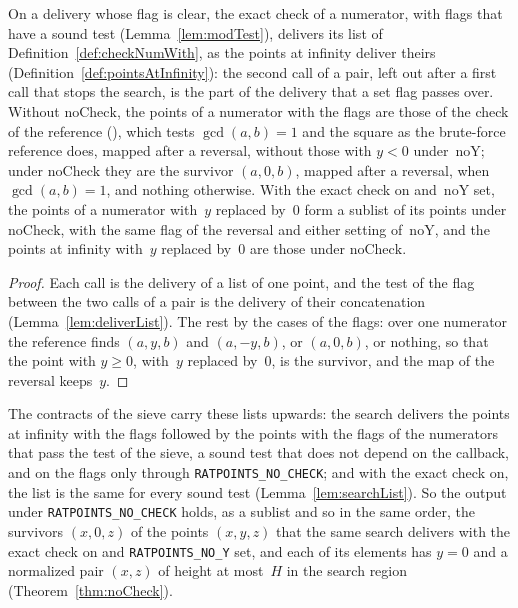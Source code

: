 \begin{lemma}\label{lem:checkNumWith}
  \leanok
  On a delivery whose flag is clear, the exact check of a numerator, with flags that have a sound
  test (Lemma~\ref{lem:modTest}), delivers its list of Definition~\ref{def:checkNumWith}, as the
  points at infinity deliver theirs (Definition~\ref{def:pointsAtInfinity}): the second call of a
  pair, left out after a first call that stops the search, is the part of the delivery that a set
  flag passes over. Without $\mathrm{noCheck}$, the points of a numerator with the flags are those
  of the check of the reference (), which tests $\gcd(a, b) = 1$ and
  the square as the brute-force reference does, mapped after a reversal, without those with $y < 0$
  under~$\mathrm{noY}$; under $\mathrm{noCheck}$ they are the survivor $(a, 0, b)$, mapped after a
  reversal, when $\gcd(a, b) = 1$, and nothing otherwise. With the exact check on and~$\mathrm{noY}$
  set, the points of a numerator with~$y$ replaced by~$0$ form a sublist of its points under
  $\mathrm{noCheck}$, with the same flag of the reversal and either setting of~$\mathrm{noY}$, and
  the points at infinity with~$y$ replaced by~$0$ are those under $\mathrm{noCheck}$.
\end{lemma}

\begin{proof}
  \leanok
  Each call is the delivery of a list of one point, and the test of the flag between the two calls
  of a pair is the delivery of their concatenation (Lemma~\ref{lem:deliverList}). The rest by the
  cases of the flags: over one numerator the reference finds $(a, y, b)$ and $(a, -y, b)$, or
  $(a, 0, b)$, or nothing, so that the point with $y \ge 0$, with~$y$ replaced by~$0$, is the
  survivor, and the map of the reversal keeps~$y$.
\end{proof}

The contracts of the sieve carry these lists upwards: the search delivers the points at infinity
with the flags followed by the points with the flags of the numerators that pass the test of the
sieve, a sound test that does not depend on the callback, and on the flags only through
\verb|RATPOINTS_NO_CHECK|; and with the exact check on, the list is the same for every sound test
(Lemma~\ref{lem:searchList}). So the output under \verb|RATPOINTS_NO_CHECK| holds, as a sublist and
so in the same order, the survivors $(x, 0, z)$ of the points $(x, y, z)$ that the same search
delivers with the exact check on and \verb|RATPOINTS_NO_Y| set, and each of its elements has $y = 0$
and a normalized pair $(x, z)$ of height at most~$H$ in the search region
(Theorem~\ref{thm:noCheck}).

